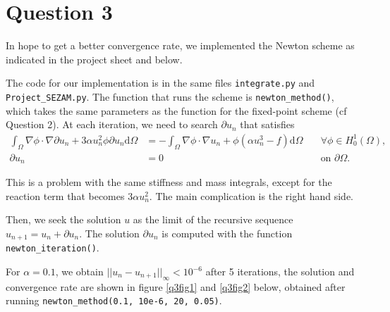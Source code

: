 \documentclass[11pt, a4paper, twoside]{article}
\newcommand{\grad}{\nabla} %
\newcommand{\Hunz}{H^1_0(\Omega)}
\newcommand{\intom}{\int_\Omega}
\renewcommand{\d}{\text{d}}
\begin{document}
\newpage
\section*{Question 3}
In hope to get a better convergence rate, we implemented the Newton scheme as indicated in the project sheet and below.

The code for our implementation is in the same files \verb+integrate.py+ and \verb+Project_SEZAM.py+. The function that runs the scheme is \verb+newton_method()+, which takes the same parameters as the function for the fixed-point scheme (cf Question 2).
At each iteration, we need to search $\partial u_n$ that satisfies 
\begin{align*}
\intom \grad \phi \cdot \grad \partial u_n + 3\alpha u_n^2 \phi \partial u_n \d\Omega
&= - \intom \grad \phi \cdot \grad u_n + \phi (\alpha u_n^3 - f) \d\Omega \quad
&\forall \phi\in \Hunz,
\\%
\partial u_n &= 0 \quad
&\text{on } \partial\Omega.
\end{align*}

This is a problem with the same stiffness and mass integrals, except for the reaction term that becomes $3\alpha u_n^2$. The main complication is the right hand side.

Then, we seek the solution $u$ as the limit of the recursive sequence $u_{n+1} =u_n + \partial u_n$.
The solution $\partial u_n$ is computed with the function \verb+newton_iteration()+.

For $\alpha = 0.1$, we obtain $||u_n -u_{n+1}||_\infty < 10^{-6}$ after 5 iterations, the solution and convergence rate are shown in figure \ref{q3fig1} and \ref{q3fig2} below, obtained after running \verb+newton_method(0.1, 10e-6, 20, 0.05)+.
\end{document}
